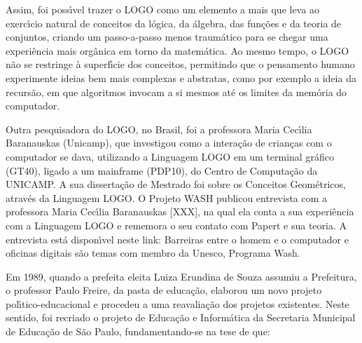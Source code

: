 \documentclass[
12pt,		%
openright,	%
twoside,  %
a4paper,			%
chapter=TITLE,		%
english,			%
french,				%
spanish,			%
brazil				%
]{USPSC-classe/USPSC}
\begin{document}
Assim, foi poss\'{\i}vel trazer o LOGO como um elemento a mais que leva ao exerc\'{\i}cio natural de conceitos da l\'ogica, da \'algebra, das fun\c{c}\~oes e da teoria de conjuntos, criando um passo-a-passo menos traum\'atico para se chegar uma experi\^encia mais org\^anica em torno da matem\'atica. Ao mesmo tempo, o LOGO n\~ao se restringe \`a superf\'{\i}cie dos conceitos, permitindo que o pensamento humano experimente ideias bem mais complexas e abstratas, como por exemplo a ideia da recurs\~ao, em que algoritmos invocam a si mesmos at\'e os limites da mem\'oria do computador.










Outra pesquisadora do LOGO, no Brasil, foi a professora Maria Cec\'{\i}lia Baranauskas (Unicamp), que investigou como a intera\c{c}\~ao de crian\c{c}as com o computador se dava, utilizando a Linguagem LOGO em um terminal gr\'afico (GT40), ligado a um mainframe (PDP10), do Centro de Computa\c{c}\~ao da UNICAMP. A sua disserta\c{c}\~ao de Mestrado foi sobre os \textquotedbl Conceitos Geom\'etricos, atrav\'es da Linguagem LOGO\textquotedbl . O Projeto WASH publicou entrevista com a professora Maria Cec\'{\i}lia Baranauskas [XXX], na qual ela conta a sua experi\^encia com a Linguagem LOGO e rememora o seu contato com Papert e sua teoria. A entrevista est\'a dispon\'{\i}vel neste link: \textquotedbl Barreiras entre o homem e o computador e oficinas digitais s\~ao temas com membro da Unesco, Programa Wash\textquotedbl .










Em 1989, quando a prefeita eleita Luiza Erundina de Souza assumiu a Prefeitura, o professor Paulo Freire, da pasta de educa\c{c}\~ao, elaborou um novo projeto pol\'{\i}tico-educacional e procedeu a uma reavalia\c{c}\~ao dos projetos existentes. Neste sentido, foi recriado o projeto de Educa\c{c}\~ao e Inform\'atica da Secretaria Municipal de Educa\c{c}\~ao de S\~ao Paulo, fundamentando-se na tese de que:











\noindent\begin{center}\mbox{\centering{}}\end{center}
\end{document}
